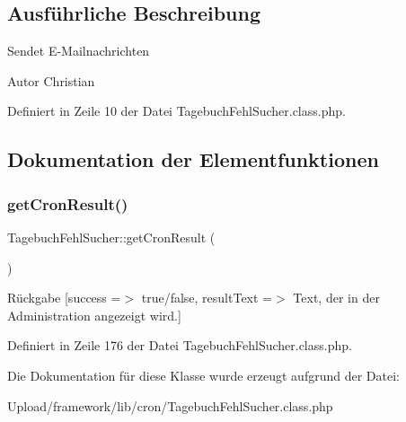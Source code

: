 \subsection{Ausführliche Beschreibung}
Sendet E-\/\+Mailnachrichten \begin{DoxyAuthor}{Autor}
Christian 
\end{DoxyAuthor}


Definiert in Zeile 10 der Datei Tagebuch\+Fehl\+Sucher.\+class.\+php.



\subsection{Dokumentation der Elementfunktionen}
\mbox{\label{class_tagebuch_fehl_sucher_a0169a614fa033ff6376e424f9116b0fb}} 
\subsubsection{\texorpdfstring{get\+Cron\+Result()}{getCronResult()}}
{\footnotesize\ttfamily Tagebuch\+Fehl\+Sucher\+::get\+Cron\+Result (\begin{DoxyParamCaption}{ }\end{DoxyParamCaption})}

\begin{DoxyReturn}{Rückgabe}
\mbox{[}\textquotesingle{}success\textquotesingle{} =$>$ \textquotesingle{}true/false\textquotesingle{}, \textquotesingle{}result\+Text\textquotesingle{} =$>$ \textquotesingle{}Text, der in der Administration angezeigt wird.\textquotesingle{}\mbox{]} 
\end{DoxyReturn}


Definiert in Zeile 176 der Datei Tagebuch\+Fehl\+Sucher.\+class.\+php.



Die Dokumentation für diese Klasse wurde erzeugt aufgrund der Datei\+:\begin{DoxyCompactItemize}
\item 
Upload/framework/lib/cron/Tagebuch\+Fehl\+Sucher.\+class.\+php\end{DoxyCompactItemize}
